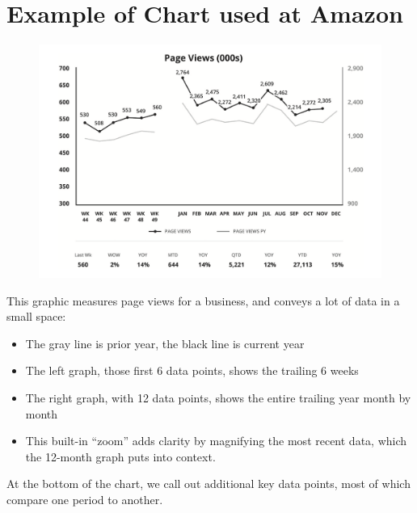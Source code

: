 \documentclass{tufte-handout}
\begin{document}
\section{Example of Chart used at Amazon}\label{sec:amazon-chart}
  \begin{figure}
    \includegraphics{amazon-page-views-chart.png}
  \end{figure}
  \par This graphic\cite{Bryar2021} measures page views for a business, and conveys a lot of data in a small space:
  \begin{itemize}
    \item{The gray line is prior year, the black line is current year}
    \item{The left graph, those first 6 data points, shows the trailing 6 weeks}
    \item{The right graph, with 12 data points, shows the entire trailing year month by month}
    \item{This built-in “zoom” adds clarity by magnifying the most recent data, which the 12-month graph puts into context.}
  \end{itemize}
  At the bottom of the chart, we call out additional key data points, most of which compare one period to another.

\newpage


\end{document}
